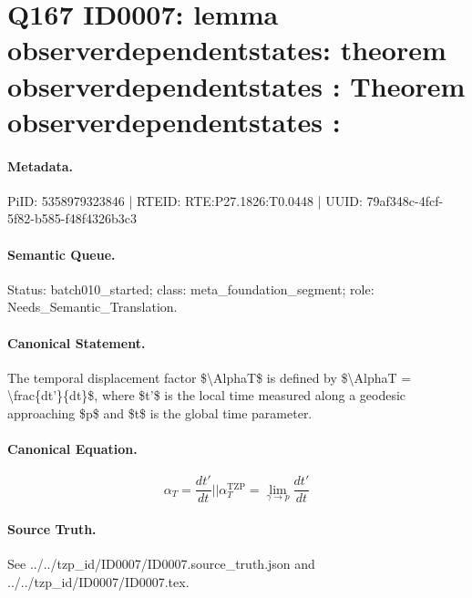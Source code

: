 \section*{Q167 ID0007: lemma observerdependentstates: theorem observerdependentstates : Theorem observerdependentstates :}
\paragraph{Metadata.}
PiID: 5358979323846 | RTEID: RTE:P27.1826:T0.0448 | UUID: 79af348c-4fcf-5f82-b585-f48f4326b3c3

\paragraph{Semantic Queue.}
Status: batch010\_started; class: meta\_foundation\_segment; role: Needs\_Semantic\_Translation.

\paragraph{Canonical Statement.}
The temporal displacement factor \$\textbackslash{}AlphaT\$ is defined by \$\textbackslash{}AlphaT = \textbackslash{}frac\{dt'\}\{dt\}\$, where \$t'\$ is the local time measured along a geodesic approaching \$p\$ and \$t\$ is the global time parameter.

\paragraph{Canonical Equation.}
\[
\alpha_{T} = \frac{dt'}{dt} || \alpha_{T}^{\mathrm{TZP}} = \lim_{\gamma \to p} \frac{dt'}{dt}
\]

\paragraph{Source Truth.}
See ../../tzp\_id/ID0007/ID0007.source\_truth.json and ../../tzp\_id/ID0007/ID0007.tex.
